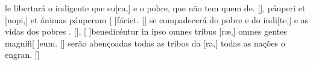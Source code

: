 {    {le libertará o indigente que su[ca,] e o po\-bre, que não tem quem de. [\LinkPT]},
  { páuperi et [nopi,] et ánimas páuperum [ ]{fá}ciet. [\LinkLA]}%
    { se compadecerá do pobre e do indi[te,] e as vidas dos pobres . [\LinkPT]},
  {[ ]{be}nedicéntur in ipso omnes tribus [ræ,] omnes gentes magnifi[ ]{e}um. [\LinkLA]}%
    { serão abençoadas todas as tribos da [ra,] todas as nações o engran. [\LinkPT]}
}